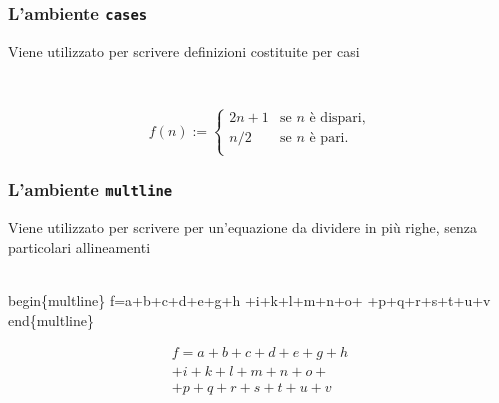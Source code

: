 \documentclass[svgnames,%
	ucs,%
	pdftex]{guitbeamer}
\begin{document}
\begin{frame}
  \frametitle{L'ambiente \texttt{cases}}
	Viene utilizzato per scrivere definizioni costituite per casi
	\begin{LaTeXcode}
		\\[\n
		f(n):=\n
		\alert{\\begin\{cases\}} \n
		\hspace*{5ex} 2n+1 \& \\text\{se \$n\$ \`e dispari,\}\bs\bs\n
		\hspace*{5ex} n/2  \& \\text\{se \$n\$ \`e pari.\}\bs\bs\n
		\alert{\\end\{cases\}} \n
		\\]
	\end{LaTeXcode}
	\begin{LaTeXoutput}
		\[
		f(n):=
		\begin{cases} 
		2n+1 & \text{se $n$ \`e dispari,}\\ 
		n/2  & \text{se $n$ \`e pari.} \\
		\end{cases}
		\]
	\end{LaTeXoutput}
\end{frame}
\begin{frame}
  \frametitle{L'ambiente \texttt{multline}}
	Viene utilizzato per scrivere per un'equazione da dividere in pi\`u righe, senza particolari allineamenti
	\begin{LaTeXcode}
		\alert{\\begin\{multline\}}\n
		\hspace*{5ex} f=a+b+c+d+e+g+h \bs\bs\n
		\hspace*{5ex} +i+k+l+m+n+o+\bs\bs\n
		\hspace*{5ex} +p+q+r+s+t+u+v \n
		\alert{\\end\{multline\}} 
	\end{LaTeXcode}
	\begin{LaTeXoutput}
		\begin{multline} 
		f=a+b+c+d+e+g+h \\ 
		+i+k+l+m+n+o+\\ 
		+p+q+r+s+t+u+v 
		\end{multline} 
	\end{LaTeXoutput}
\end{frame}
\end{document}
